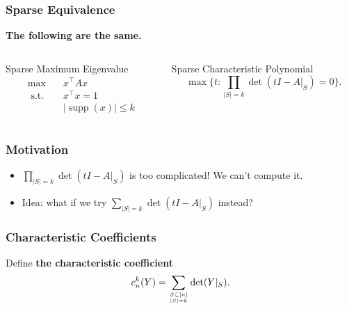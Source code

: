 \documentclass{beamer}
\DeclareMathOperator*{\supp}{supp}
\newcommand{\st}{{\text{ s.t. }}}
\renewcommand\top[2]{\genfrac{}{}{0pt}{}{#1}{#2}}
\begin{document}
\begin{frame}
    \frametitle{Sparse Equivalence}
    \textbf{The following are the same.}
    \vspace{0.3in}
    \begin{columns}
        \begin{column}{0.48\textwidth}
            \begin{block}{Sparse Maximum Eigenvalue}
            \begin{equation*}
                \begin{aligned}
                    \max\quad & x^{\intercal}Ax\\
                    \st & x^{\intercal}x = 1\\
                        & |\supp(x)| \le k
                \end{aligned}
            \end{equation*}
            \end{block}
        \end{column}
        \pause
        \begin{column}{0.48\textwidth}
            \begin{block}{Sparse Characteristic Polynomial}
            \[
                \max \{t : \prod_{|S| = k}\det(tI - A|_S) = 0\}.
            \]
            \end{block}
        \end{column}
    \end{columns}
\end{frame}
\begin{frame}
    \frametitle{Motivation}
    \begin{itemize}
        \item $\prod_{|S| = k}\det(tI - A|_S)$ is too complicated! We can't compute it.
        \pause 
        \item Idea: what if we try $\sum_{|S| = k}\det(tI - A|_S)$ instead?
    \end{itemize}
\end{frame}
\begin{frame}
    \frametitle{Characteristic Coefficients}
    Define \textbf{the characteristic coefficient}
    \[
        c_n^k(Y) = \sum_{\top{S \subseteq [n]}{|S| = k}}  \det(Y|_S).
    \]
\end{frame}
\end{document}
